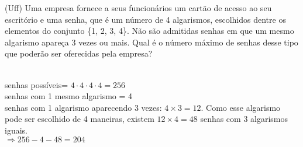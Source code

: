 \begin{ex}
 	(Uff) Uma empresa fornece a seus funcionários um cartão de acesso ao seu escritório e uma senha, que é um número de 4 algarismos, escolhidos dentre os elementos do conjunto \{1, 2, 3, 4\}.  Não são admitidas senhas em que um mesmo algarismo apareça 3 vezes ou mais. Qual é o número máximo de senhas desse tipo que poderão ser oferecidas pela empresa?
 	  \begin{sol}
 	    \phantom{A} \\
 	    senhas possíveis= $4\cdot4\cdot4\cdot4=256$  \\
 	    senhas com 1 mesmo algarismo = 4  \\
 	    senhas com 1 algarismo aparecendo 3 vezes: $4\times3 =12$. Como esse algarismo pode ser escolhido de 4 maneiras, existem $12\times4=48$ senhas com 3 algarismos iguais. \\ 
 	    $\Longrightarrow 256 - 4 - 48 = 204$
 	  \end{sol}
\end{ex}